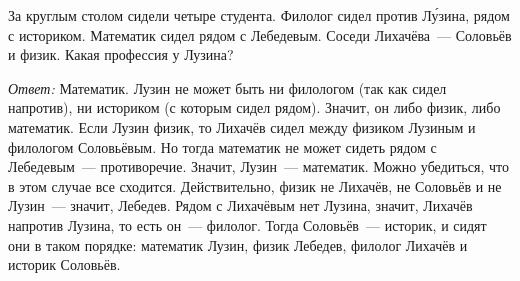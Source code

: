 \problem
За круглым столом сидели четыре студента.
Филолог сидел против Л\'{у}зина, рядом с историком.
Математик сидел рядом с Лебедевым.
Соседи Лихачёва~--- Соловьёв и физик.
Какая профессия у Лузина?

\solution
\emph{Ответ:} Математик.
Лузин не может быть ни филологом (так как сидел напротив), ни историком
(с которым сидел рядом).
Значит, он либо физик, либо математик.
Если Лузин физик, то Лихачёв сидел между физиком Лузиным и филологом
Соловьёвым.
Но тогда математик не может сидеть рядом с Лебедевым~--- противоречие.
Значит, Лузин~--- математик.
Можно убедиться, что в этом случае все сходится.
Действительно, физик не Лихачёв, не Соловьёв и не Лузин~--- значит, Лебедев.
Рядом с Лихачёвым нет Лузина, значит, Лихачёв напротив Лузина, то есть он~---
филолог.
Тогда Соловьёв~--- историк, и сидят они в таком порядке:
математик Лузин, физик Лебедев, филолог Лихачёв и историк Соловьёв.

\endproblem
